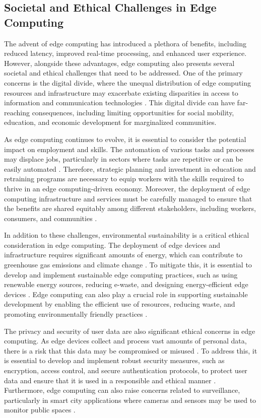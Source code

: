 \documentclass[11pt,a4paper]{article}
\begin{document}
\subsection{Societal and Ethical Challenges in Edge Computing}


The advent of edge computing has introduced a plethora of benefits, including reduced latency, improved real-time processing, and enhanced user experience. However, alongside these advantages, edge computing also presents several societal and ethical challenges that need to be addressed. One of the primary concerns is the digital divide, where the unequal distribution of edge computing resources and infrastructure may exacerbate existing disparities in access to information and communication technologies \cite{arxiv:1912.08530}. This digital divide can have far-reaching consequences, including limiting opportunities for social mobility, education, and economic development for marginalized communities.

As edge computing continues to evolve, it is essential to consider the potential impact on employment and skills. The automation of various tasks and processes may displace jobs, particularly in sectors where tasks are repetitive or can be easily automated \cite{arxiv:2407.17314}. Therefore, strategic planning and investment in education and retraining programs are necessary to equip workers with the skills required to thrive in an edge computing-driven economy. Moreover, the deployment of edge computing infrastructure and services must be carefully managed to ensure that the benefits are shared equitably among different stakeholders, including workers, consumers, and communities \cite{arxiv:2109.03395}.

In addition to these challenges, environmental sustainability is a critical ethical consideration in edge computing. The deployment of edge devices and infrastructure requires significant amounts of energy, which can contribute to greenhouse gas emissions and climate change \cite{arxiv:2211.01863}. To mitigate this, it is essential to develop and implement sustainable edge computing practices, such as using renewable energy sources, reducing e-waste, and designing energy-efficient edge devices \cite{arxiv:1810.13287}. Edge computing can also play a crucial role in supporting sustainable development by enabling the efficient use of resources, reducing waste, and promoting environmentally friendly practices \cite{arxiv:2112.01250}.

The privacy and security of user data are also significant ethical concerns in edge computing. As edge devices collect and process vast amounts of personal data, there is a risk that this data may be compromised or misused \cite{arxiv:2206.07164}. To address this, it is essential to develop and implement robust security measures, such as encryption, access control, and secure authentication protocols, to protect user data and ensure that it is used in a responsible and ethical manner \cite{arxiv:2107.13374}. Furthermore, edge computing can also raise concerns related to surveillance, particularly in smart city applications where cameras and sensors may be used to monitor public spaces \cite{arxiv:2201.00242}.
\end{document}
